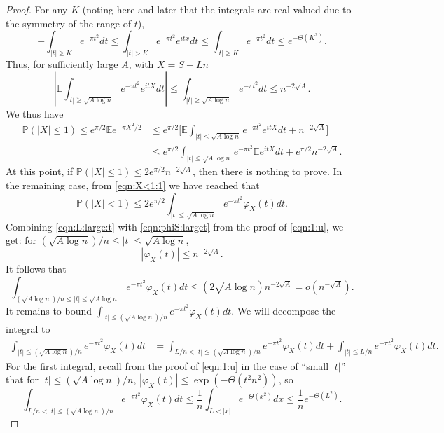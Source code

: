 \documentclass[reqno]{amsart}
\renewcommand\P{{\mathbb{P}}}
\newcommand\E{{\mathbb{E}}}
\theoremstyle{plain}
\theoremstyle{definition}
\begin{document}
\begin{proof}
For any $K$ (noting here and later that the integrals are real valued due to the symmetry of the range of $t$),
$$-\int_{|t|\ge K} e^{-\pi  t^{2}}dt  \le \int_{|t|>K} e^{-\pi  t^{2}} e^{i t x} dt  \le \int_{|t|\ge K} e^{-\pi  t^{2}} dt \le e^{-\Theta(K^{2})}.$$ 
Thus, for sufficiently large $A$, with $X=S-Ln$
$$|\E \int_{|t| \ge \sqrt{A\log n}} e^{-\pi  t^{2}} e^{i t X} dt| \le \int_{|t| \ge \sqrt{A\log n}} e^{-\pi  t^{2}} dt  \le n^{-2\sqrt{A}}.$$
We thus have 
\begin{align}\label{eqn:X<1:1}
\P(|X|\le 1) \le e^{\pi/2}  \E e^{-\pi X^{2}/2} &\le e^{\pi/2} \Big[   \E \int_{|t| \le \sqrt{A\log n}} e^{-\pi  t^{2}} e^{i t X} dt + n^{-2\sqrt{A}} \Big] \nonumber \\
&\le  e^{\pi/2} \int_{|t| \le \sqrt{A\log n}} e^{-\pi  t^{2}} \E e^{i t X} dt + e^{\pi/2} n^{-2\sqrt{A}}.
\end{align}
At this point, if $\P(|X| \le 1) \le 2e^{\pi /2} n^{-2\sqrt{A}}$, then there is nothing to prove.
In the remaining case, from \eqref{eqn:X<1:1} we have reached that  
$$\P(|X|<1) \le 2 e^{\pi/2} \int_{|t| \le \sqrt{A\log n}} e^{-\pi  t^{2}} \varphi_{X}(t) dt.$$
Combining \eqref{eqn:L:large:t} with \eqref{eqn:phiS:larget} from the proof of \eqref{eqn:1:u}, we get: for $(\sqrt{A\log n})/n \le |t| \le \sqrt{A\log n}$, 
$$|\varphi_{X}(t)| \le n^{-2\sqrt{A}}.$$
It follows that
$$
\int_{(\sqrt{A\log n})/n\le |t| \le \sqrt{A\log n}} e^{-\pi  t^{2}} \varphi_{X}(t) dt \le (2\sqrt{A\log n})n^{-2\sqrt{A}} = o(n^{-\sqrt{A}}).
$$
It remains to bound $ \int_{|t| \le (\sqrt{A\log n})/n} e^{-\pi  t^{2}} \varphi_{X}(t) dt$.
We will decompose the integral to
\begin{align*}
\int_{|t| \le (\sqrt{A\log n})/n} e^{-\pi  t^{2}} \varphi_{X}(t) dt & =  \int_{  L/n< |t| \le (\sqrt{A\log n})/n} e^{-\pi  t^{2}} \varphi_{X}(t) dt +\int_{|t| \le L/n} e^{-\pi  t^{2}} \varphi_{X}(t) dt.
\end{align*}
For the first integral, recall from the proof of \eqref{eqn:1:u} in the case of ``small $|t|$'' that for $|t|\le (\sqrt{A\log n})/n$, $|\varphi_{X}(t)| \le \exp(-\Theta (t^{2}n^{2}))$, so
$$\int_{  L/n< |t| \le (\sqrt{A\log n})/n} e^{-\pi  t^{2}} \varphi_{X}(t) dt \le \frac{1}{n}\int_{L<|x|} e^{-\Theta(x^{2})} dx \le  \frac{1}{n}e^{-\Theta(L^{2})}.$$


\end{proof}
\end{document}
